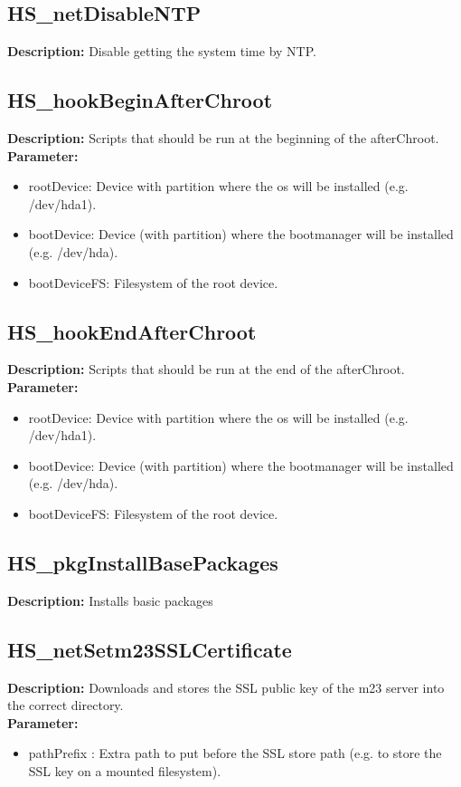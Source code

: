 \subsection{HS\_netDisableNTP}
\textbf{Description:} Disable getting the system time by NTP.\\

\subsection{HS\_hookBeginAfterChroot}
\textbf{Description:} Scripts that should be run at the beginning of the afterChroot.\\
\textbf{Parameter:}
\begin{itemize}
\item rootDevice: Device with partition where the os will be installed (e.g. /dev/hda1).
\item bootDevice: Device (with partition) where the bootmanager will be installed (e.g. /dev/hda).
\item bootDeviceFS: Filesystem of the root device.
\end{itemize}

\subsection{HS\_hookEndAfterChroot}
\textbf{Description:} Scripts that should be run at the end of the afterChroot.\\
\textbf{Parameter:}
\begin{itemize}
\item rootDevice: Device with partition where the os will be installed (e.g. /dev/hda1).
\item bootDevice: Device (with partition) where the bootmanager will be installed (e.g. /dev/hda).
\item bootDeviceFS: Filesystem of the root device.
\end{itemize}

\subsection{HS\_pkgInstallBasePackages}
\textbf{Description:} Installs basic packages\\

\subsection{HS\_netSetm23SSLCertificate}
\textbf{Description:} Downloads and stores the SSL public key of the m23 server into the correct directory.\\
\textbf{Parameter:}
\begin{itemize}
\item pathPrefix : Extra path to put before the SSL store path (e.g. to store the SSL key on a mounted filesystem).
\end{itemize}

